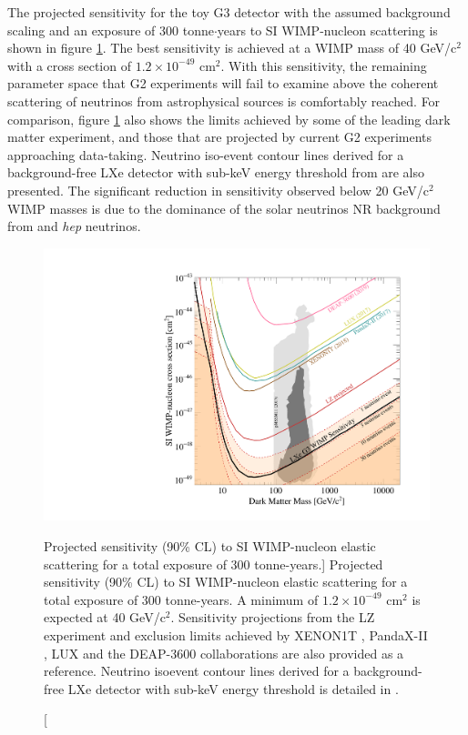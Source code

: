The projected sensitivity for the toy G3 detector with the assumed background scaling and an exposure of 300 tonne$\cdot$years to SI WIMP-nucleon scattering is shown in figure \ref{Fig:si_wimp_sensitivity}. The best sensitivity is achieved at a WIMP mass of 40 GeV/c$^{2}$ with a cross section of $1.2 \times 10^{-49}$ cm$^{2}$. With this sensitivity, the remaining parameter space that G2 experiments will fail to examine above the coherent scattering of neutrinos from astrophysical sources is comfortably reached. For comparison, figure \ref{Fig:si_wimp_sensitivity} also shows the limits achieved by some of the leading dark matter experiment, and those that are projected by current G2 experiments approaching data-taking. Neutrino iso-event contour lines derived for a background-free LXe detector with sub-keV energy threshold from \cite{neutrino_floor} are also presented. The significant reduction in sensitivity observed below 20 GeV/c$^{2}$ WIMP masses is due to the dominance of the solar neutrinos NR background from \BE{} and \textit{hep} neutrinos. 


\begin{figure}[h!]
    \centerline{\includegraphics[width=\linewidth]{Chapter_6/Figures/g3dm_si_vs_mass.pdf}}
    \caption
    [Projected sensitivity (90\% CL) to SI WIMP-nucleon elastic scattering for a total exposure of 300 tonne-years.]
    {Projected sensitivity (90\% CL) to SI WIMP-nucleon elastic scattering for a total exposure of 300 tonne-years. A minimum of $1.2 \times 10^{-49}$ cm$^{2}$ is expected at 40 GeV/c$^{2}$. Sensitivity projections from the LZ experiment \cite{akerib2018projected} and exclusion limits achieved by XENON1T \cite{xenon_1t}, PandaX-II \cite{pandax_limit}, LUX \cite{Akerib:2017kat} and the DEAP-3600 \cite{DEAP_3600} collaborations are also provided as a reference. Neutrino isoevent contour lines derived for a background-free LXe detector with sub-keV energy threshold is detailed in \cite{neutrino_floor}.}
    \label{Fig:si_wimp_sensitivity}
\end{figure}

\newpage